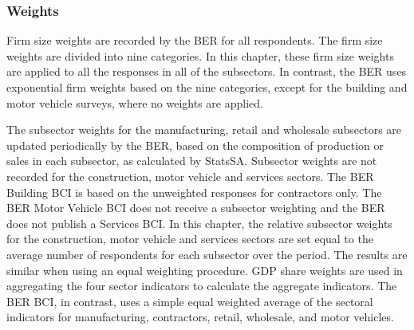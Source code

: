 \documentclass[11pt,]{article}
\begin{document}
\begin{table}[]
\centering
\caption{Survey questions used by sector}
\end{table}

\subsubsection{Weights}\label{weights}

Firm size weights are recorded by the BER for all respondents. The firm
size weights are divided into nine categories. In this chapter, these
firm size weights are applied to all the responses in all of the
subsectors. In contrast, the BER uses exponential firm weights based on
the nine categories, except for the building and motor vehicle surveys,
where no weights are applied.

The subsector weights for the manufacturing, retail and wholesale
subsectors are updated periodically by the BER, based on the composition
of production or sales in each subsector, as calculated by StatsSA.
Subsector weights are not recorded for the construction, motor vehicle
and services sectors. The BER Building BCI is based on the unweighted
responses for contractors only. The BER Motor Vehicle BCI does not
receive a subsector weighting and the BER does not publish a Services
BCI. In this chapter, the relative subsector weights for the
construction, motor vehicle and services sectors are set equal to the
average number of respondents for each subsector over the period. The
results are similar when using an equal weighting procedure. GDP share
weights are used in aggregating the four sector indicators to calculate
the aggregate indicators. The BER BCI, in contrast, uses a simple equal
weighted average of the sectoral indicators for manufacturing,
contractors, retail, wholesale, and motor vehicles.
\end{document}
